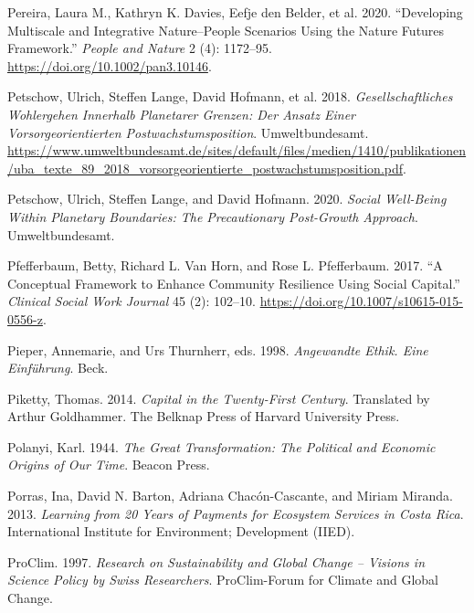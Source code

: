 \documentclass[
  a4paper,
  DIV=11,
  numbers=noendperiod,
  oneside,
  openany]{scrreprt}
\newlength{\cslhangindent}
\newenvironment{CSLReferences}[2] %
 {\begin{list}{}{%
  \setlength{\itemindent}{0pt}
  \setlength{\leftmargin}{0pt}
  \setlength{\parsep}{0pt}
  \ifodd #1
   \setlength{\leftmargin}{\cslhangindent}
   \setlength{\itemindent}{-1\cslhangindent}
  \fi
  \setlength{\itemsep}{#2\baselineskip}}}
 {\end{list}}
\begin{document}
\begin{CSLReferences}{1}{1}
{Pereira, Laura M., Kathryn K. Davies, Eefje den Belder, et al.} 2020.
{``Developing Multiscale and Integrative Nature--People Scenarios Using
the {Nature Futures Framework}.''} \emph{People and Nature} 2 (4):
1172--95. \url{https://doi.org/10.1002/pan3.10146}.

Petschow, Ulrich, Steffen Lange, David Hofmann, et al. 2018.
\emph{Gesellschaftliches {Wohlergehen} Innerhalb Planetarer {Grenzen}:
{Der} {Ansatz} Einer Vorsorgeorientierten {Postwachstumsposition}}.
Umweltbundesamt.
\url{https://www.umweltbundesamt.de/sites/default/files/medien/1410/publikationen/uba_texte_89_2018_vorsorgeorientierte_postwachstumsposition.pdf}.

Petschow, Ulrich, Steffen Lange, and David Hofmann. 2020. \emph{Social
{Well-Being Within Planetary Boundaries}: The {Precautionary Post-Growth
Approach}}. Umweltbundesamt.

Pfefferbaum, Betty, Richard L. Van Horn, and Rose L. Pfefferbaum. 2017.
{``A {Conceptual Framework} to {Enhance Community Resilience Using
Social Capital}.''} \emph{Clinical Social Work Journal} 45 (2): 102--10.
\url{https://doi.org/10.1007/s10615-015-0556-z}.

Pieper, Annemarie, and Urs Thurnherr, eds. 1998. \emph{Angewandte
{Ethik}. {Eine} {Einführung}}. Beck.

Piketty, Thomas. 2014. \emph{Capital in the {Twenty-First Century}}.
Translated by Arthur Goldhammer. The Belknap Press of Harvard University
Press.

Polanyi, Karl. 1944. \emph{The {Great Transformation}: {The Political}
and {Economic Origins} of {Our Time}}. Beacon Press.

Porras, Ina, David N. Barton, Adriana Chacón-Cascante, and Miriam
Miranda. 2013. \emph{Learning from 20 Years of {Payments} for
{Ecosystem} {Services} in {Costa} {Rica}}. International Institute for
Environment; Development (IIED).

ProClim. 1997. \emph{Research on {Sustainability} and {Global Change} --
{Visions} in {Science Policy} by {Swiss Researchers}}. {ProClim-Forum
for Climate and Global Change}.


\end{CSLReferences}
\end{document}
